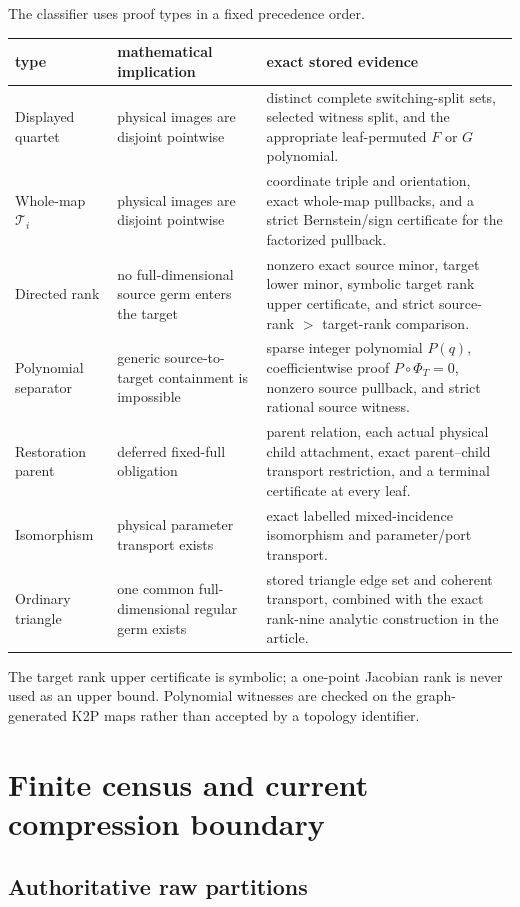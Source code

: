 \documentclass[11pt]{article}
\theoremstyle{remark}
\newcommand{\Ti}{\mathcal T_i}
\begin{document}
The classifier uses proof types in a fixed precedence order.

\begin{longtable}{L{.19\linewidth}L{.33\linewidth}L{.39\linewidth}}
\toprule
type & mathematical implication & exact stored evidence\\
\midrule
\endhead
Displayed quartet
& physical images are disjoint pointwise
& distinct complete switching-split sets, selected witness split, and the
appropriate leaf-permuted \(F\) or \(G\) polynomial.\\
Whole-map \(\Ti\)
& physical images are disjoint pointwise
& coordinate triple and orientation, exact whole-map pullbacks, and a
strict Bernstein/sign certificate for the factorized pullback.\\
Directed rank
& no full-dimensional source germ enters the target
& nonzero exact source minor, target lower minor, symbolic target rank upper
certificate, and strict source-rank \(>\) target-rank comparison.\\
Polynomial separator
& generic source-to-target containment is impossible
& sparse integer polynomial \(P(q)\), coefficientwise proof
\(P\circ\Phi_T=0\), nonzero source pullback, and strict rational source
witness.\\
Restoration parent
& deferred fixed-full obligation
& parent relation, each actual physical child attachment, exact parent--child
transport restriction, and a terminal certificate at every leaf.\\
Isomorphism
& physical parameter transport exists
& exact labelled mixed-incidence isomorphism and parameter/port transport.\\
Ordinary triangle
& one common full-dimensional regular germ exists
& stored triangle edge set and coherent transport, combined with the exact
rank-nine analytic construction in the article.\\
\bottomrule
\end{longtable}

The target rank upper certificate is symbolic; a one-point Jacobian rank is
never used as an upper bound.  Polynomial witnesses are checked on the graph-
generated K2P maps rather than accepted by a topology identifier.

\section{Finite census and current compression boundary}\label{sec:census}

\subsection{Authoritative raw partitions}
\end{document}
